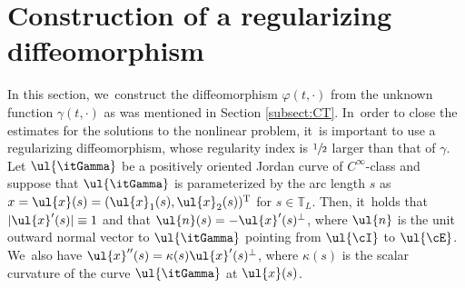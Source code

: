 \section{Construction of a regularizing diffeomorphism}\label{sect:diffeo}
In this section, we~construct the diffeomorphism $\varphi(t,\cdot)$ from the unknown function $\gamma(t,\cdot)$ as was mentioned in Section \ref{subsect:CT}. In~order to close the estimates for the solutions to the nonlinear problem, it~is important to use a regularizing diffeomorphism, whose regularity index is
$\sfrac12$ larger than that of $\gamma$.
Let $\ul{\itGamma}$ be a positively oriented Jordan curve of $C^\infty$-class and suppose that $\ul{\itGamma}$ is parameterized by the arc length $s$ as
$x = \ul{x}(s) = (\ul{x}_1(s),\ul{x}_2(s))^\mathrm{T}$ for $s \in \mathbb{T}_L$.
Then, it~holds that $|\ul{x}'(s)| \equiv 1$ and that $\ul{n}(s)=-\ul{x}'(s)^\perp$, where $\ul{n}$ is the unit outward normal vector to $\ul{\itGamma}$
pointing from $\ul{\cI}$ to $\ul{\cE}$. We~also have $\ul{x}''(s)=\kappa(s)\ul{x}'(s)^\perp$, where $\kappa(s)$ is the scalar curvature of the curve $\ul{\itGamma}$ at $\ul{x}(s)$.

